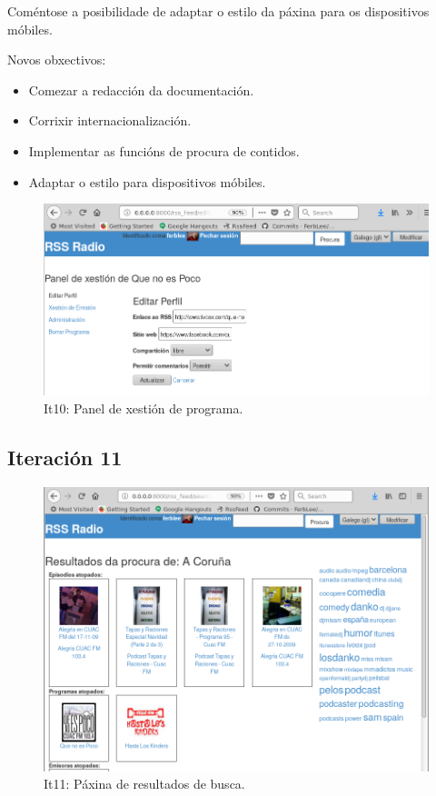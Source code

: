 Coméntose a posibilidade de adaptar o estilo da páxina para os dispositivos móbiles.

Novos obxectivos:
\begin{itemize}
	\item Comezar a redacción da documentación.
	\item Corrixir internacionalización.
	\item Implementar as funcións de procura de contidos.
	\item Adaptar o estilo para dispositivos móbiles.
\end{itemize}

\begin{figure}[h]
	\centering
	\includegraphics[scale=0.5,keepaspectratio=true]{./images/xestion_final.png}
	\caption{It10: Panel de xestión de programa.}
	\label{fig:xestionl_final}
\end{figure}


\subsection{Iteración 11}

\begin{figure}[H]
	\centering
	\includegraphics[scale=0.4,keepaspectratio=true]{./images/procura_final.png}
	\caption{It11: Páxina de resultados de busca.}
	\label{fig:procura_final}
\end{figure}

